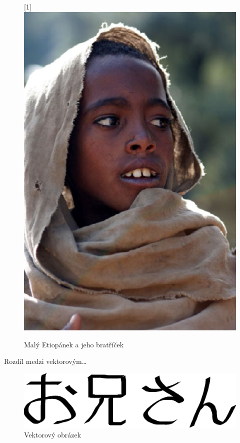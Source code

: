 \documentclass[a4paper, 11pt]{article}
\begin{document}
\begin{figure}[h]
       \scalebox{-1}[1]{\includegraphics[scale=0.4]{etiopan.eps}}
       \caption{Malý Etiopánek a jeho bratříček}
       \label{images:image1}
    \end{figure}
Rozdíl medzi vektorovým\dots

\begin{figure}[h] 
   \centering
   \includegraphics[scale=0.4]{oniisan.eps}
   \caption{Vektorový obrázek}
   \label{images:image2}
\end{figure}
\end{document}
